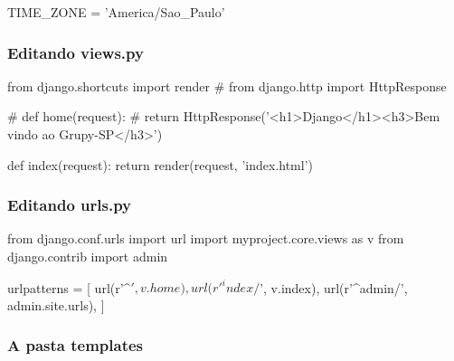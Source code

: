 \documentclass{beamer}
\begin{document}
{\begin{frame}[fragile]
\begin{pythoncode}
TIME_ZONE = 'America/Sao_Paulo'
\end{pythoncode}


\end{frame}



\begin{frame}[fragile]\frametitle{Editando views.py}

\begin{pythoncode}
from django.shortcuts import render
# from django.http import HttpResponse

# def home(request):
#     return HttpResponse('<h1>Django</h1><h3>Bem vindo ao Grupy-SP</h3>')

def index(request):
    return render(request, 'index.html')
\end{pythoncode}


\end{frame}

\begin{frame}[fragile]\frametitle{Editando urls.py}

\begin{pythoncode}
from django.conf.urls import url
import myproject.core.views as v
from django.contrib import admin

urlpatterns = [
    url(r'^$', v.home),
    url(r'^index/$', v.index),
    url(r'^admin/', admin.site.urls),
]
\end{pythoncode}


\end{frame}


\begin{frame}\frametitle{A pasta templates}


\end{frame}

\begin{frame}


\end{frame}}
\end{document}
